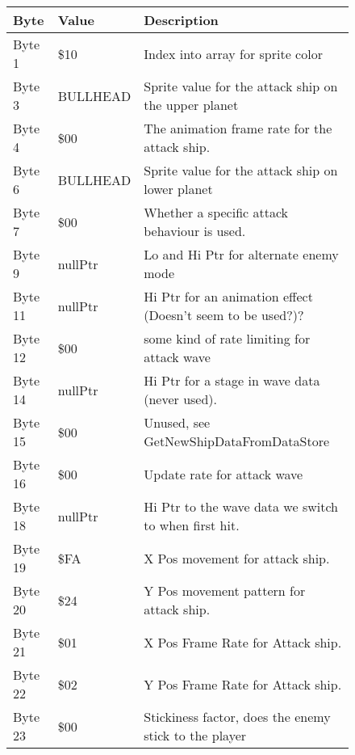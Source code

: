 \begin{figure}[H]
{\begin{adjustbox}{width=12cm}
\begin{tabular}{lll}
\toprule
 Byte    & Value              & Description                                                        \\
\midrule
 Byte 1  & \$10                & Index into array for sprite color                                  \\
 Byte 3  & BULLHEAD           & Sprite value for the attack ship on the upper planet               \\
 Byte 4  & \$00                & The animation frame rate for the attack ship.                      \\
 Byte 6  & BULLHEAD           & Sprite value for the attack ship on lower planet                   \\
 Byte 7  & \$00                & Whether a specific attack behaviour is used.                       \\
 Byte 9  & nullPtr            & Lo and Hi Ptr for alternate enemy mode                             \\
 Byte 11 & nullPtr            & Hi Ptr for an animation effect (Doesn't seem to be used?)?         \\
 Byte 12 & \$00                & some kind of rate limiting for attack wave                         \\
 Byte 14 & nullPtr            & Hi Ptr for a stage in wave data (never used).                      \\
 Byte 15 & \$00                & Unused, see GetNewShipDataFromDataStore                            \\
 Byte 16 & \$00                & Update rate for attack wave                                        \\
 Byte 18 & nullPtr            & Hi Ptr to the wave data we switch to when first hit.               \\
 Byte 19 & \$FA                & X Pos movement for attack ship.                                    \\
 Byte 20 & \$24                & Y Pos movement pattern for attack ship.                            \\
 Byte 21 & \$01                & X Pos Frame Rate for Attack ship.                                  \\
 Byte 22 & \$02                & Y Pos Frame Rate for Attack ship.                                  \\
 Byte 23 & \$00                & Stickiness factor, does the enemy stick to the player              \\

\end{tabular}
\end{adjustbox}}
\end{figure}
